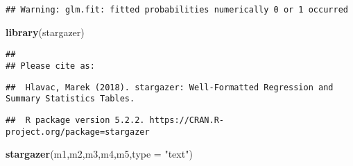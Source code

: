 \documentclass[]{article}
\newenvironment{Shaded}{\begin{snugshade}}{\end{snugshade}}
\newcommand{\KeywordTok}[1]{\textcolor[rgb]{0.13,0.29,0.53}{\textbf{#1}}}
\newcommand{\DataTypeTok}[1]{\textcolor[rgb]{0.13,0.29,0.53}{#1}}
\newcommand{\StringTok}[1]{\textcolor[rgb]{0.31,0.60,0.02}{#1}}
\newcommand{\NormalTok}[1]{#1}
\begin{document}
\begin{verbatim}
## Warning: glm.fit: fitted probabilities numerically 0 or 1 occurred
\end{verbatim}

\begin{Shaded}
\begin{Highlighting}[]
\KeywordTok{library}\NormalTok{(stargazer)}
\end{Highlighting}
\end{Shaded}

\begin{verbatim}
## 
## Please cite as:
\end{verbatim}

\begin{verbatim}
##  Hlavac, Marek (2018). stargazer: Well-Formatted Regression and Summary Statistics Tables.
\end{verbatim}

\begin{verbatim}
##  R package version 5.2.2. https://CRAN.R-project.org/package=stargazer
\end{verbatim}

\begin{Shaded}
\begin{Highlighting}[]
\KeywordTok{stargazer}\NormalTok{(m1,m2,m3,m4,m5,}\DataTypeTok{type =} \StringTok{"text"}\NormalTok{)}
\end{Highlighting}
\end{Shaded}
\end{document}
